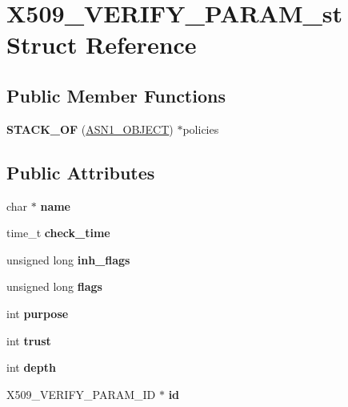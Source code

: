 \hypertarget{structX509__VERIFY__PARAM__st}{}\section{X509\+\_\+\+V\+E\+R\+I\+F\+Y\+\_\+\+P\+A\+R\+A\+M\+\_\+st Struct Reference}
\label{structX509__VERIFY__PARAM__st}
\subsection*{Public Member Functions}
\begin{DoxyCompactItemize}
\item 
\mbox{\label{structX509__VERIFY__PARAM__st_a624eee0c97028e3e98e062b25e1f429c}} 
{\bfseries S\+T\+A\+C\+K\+\_\+\+OF} (\hyperlink{structasn1__object__st}{A\+S\+N1\+\_\+\+O\+B\+J\+E\+CT}) $\ast$policies
\end{DoxyCompactItemize}
\subsection*{Public Attributes}
\begin{DoxyCompactItemize}
\item 
\mbox{\label{structX509__VERIFY__PARAM__st_a60084caf30e3bddf4fe9264a76441411}} 
char $\ast$ {\bfseries name}
\item 
\mbox{\label{structX509__VERIFY__PARAM__st_a2f5100a1ff11cf55b96ddaf802f434d0}} 
time\+\_\+t {\bfseries check\+\_\+time}
\item 
\mbox{\label{structX509__VERIFY__PARAM__st_ae194a37f094a45b53ddd8156c5e2bab1}} 
unsigned long {\bfseries inh\+\_\+flags}
\item 
\mbox{\label{structX509__VERIFY__PARAM__st_a3ef03c3f57b0a90d4182a057fe0c8d27}} 
unsigned long {\bfseries flags}
\item 
\mbox{\label{structX509__VERIFY__PARAM__st_acae8fafa928701889f757951552f5ee9}} 
int {\bfseries purpose}
\item 
\mbox{\label{structX509__VERIFY__PARAM__st_a7b7d5b079ed79cb2399ad471d1b57415}} 
int {\bfseries trust}
\item 
\mbox{\label{structX509__VERIFY__PARAM__st_afb5fd48dac56bdbd2e1d9e8e69bfaf23}} 
int {\bfseries depth}
\item 
\mbox{\label{structX509__VERIFY__PARAM__st_ab9c2e605d0970db1e3069c9449155793}} 
X509\+\_\+\+V\+E\+R\+I\+F\+Y\+\_\+\+P\+A\+R\+A\+M\+\_\+\+ID $\ast$ {\bfseries id}
\end{DoxyCompactItemize}


